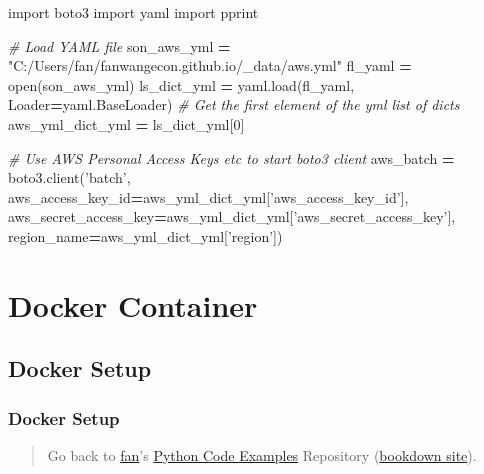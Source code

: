 \documentclass[
]{book}
\newenvironment{Shaded}{\begin{snugshade}}{\end{snugshade}}
\newcommand{\BuiltInTok}[1]{#1}
\newcommand{\CommentTok}[1]{\textcolor[rgb]{0.56,0.35,0.01}{\textit{#1}}}
\newcommand{\DecValTok}[1]{\textcolor[rgb]{0.00,0.00,0.81}{#1}}
\newcommand{\ImportTok}[1]{#1}
\newcommand{\NormalTok}[1]{#1}
\newcommand{\OperatorTok}[1]{\textcolor[rgb]{0.81,0.36,0.00}{\textbf{#1}}}
\newcommand{\StringTok}[1]{\textcolor[rgb]{0.31,0.60,0.02}{#1}}
\begin{document}
\begin{Shaded}
\begin{Highlighting}[]
\ImportTok{import}\NormalTok{ boto3}
\ImportTok{import}\NormalTok{ yaml}
\ImportTok{import}\NormalTok{ pprint}

\CommentTok{# Load YAML file}
\NormalTok{son_aws_yml }\OperatorTok{=} \StringTok{"C:/Users/fan/fanwangecon.github.io/_data/aws.yml"}
\NormalTok{fl_yaml }\OperatorTok{=} \BuiltInTok{open}\NormalTok{(son_aws_yml)}
\NormalTok{ls_dict_yml }\OperatorTok{=}\NormalTok{ yaml.load(fl_yaml, Loader}\OperatorTok{=}\NormalTok{yaml.BaseLoader)}
\CommentTok{# Get the first element of the yml list of dicts}
\NormalTok{aws_yml_dict_yml }\OperatorTok{=}\NormalTok{ ls_dict_yml[}\DecValTok{0}\NormalTok{]}

\CommentTok{# Use AWS Personal Access Keys etc to start boto3 client}
\NormalTok{aws_batch }\OperatorTok{=}\NormalTok{ boto3.client(}\StringTok{'batch'}\NormalTok{,}
\NormalTok{  aws_access_key_id}\OperatorTok{=}\NormalTok{aws_yml_dict_yml[}\StringTok{'aws_access_key_id'}\NormalTok{],}
\NormalTok{  aws_secret_access_key}\OperatorTok{=}\NormalTok{aws_yml_dict_yml[}\StringTok{'aws_secret_access_key'}\NormalTok{],}
\NormalTok{  region_name}\OperatorTok{=}\NormalTok{aws_yml_dict_yml[}\StringTok{'region'}\NormalTok{])}
\end{Highlighting}
\end{Shaded}

\hypertarget{docker-container}{%
\chapter{Docker Container}\label{docker-container}}

\hypertarget{docker-setup}{%
\section{Docker Setup}\label{docker-setup}}

\hypertarget{docker-setup-1}{%
\subsection{Docker Setup}\label{docker-setup-1}}

\begin{quote}
Go back to \href{http://fanwangecon.github.io/}{fan}'s \href{https://fanwangecon.github.io/pyfan/}{Python Code Examples} Repository (\href{https://fanwangecon.github.io/pyfan/bookdown}{bookdown site}).
\end{quote}
\end{document}
